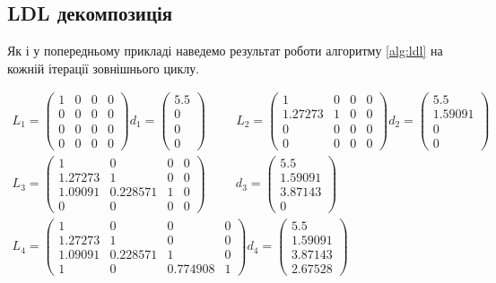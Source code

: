 \subsection*{LDL декомпозиція}

Як і у попередньому прикладі наведемо результат роботи
алгоритму \ref{alg:ldl} на кожній ітерації зовнішнього циклу.

\begin{gather*}
    L_1 = \begin{pmatrix}
        1 & 0 & 0 & 0 \\
        0 & 0 & 0 & 0 \\
        0 & 0 & 0 & 0 \\
        0 & 0 & 0 & 0
    \end{pmatrix}
    d_1 = \begin{pmatrix}
        5.5 \\ 0 \\ 0 \\ 0
    \end{pmatrix} \hspace{1cm}
    L_2 = \begin{pmatrix}
        1 & 0 & 0 & 0 \\
        1.27273 & 1 & 0 & 0 \\
        0 & 0 & 0 & 0 \\
        0 & 0 & 0 & 0
    \end{pmatrix}
    d_2 = \begin{pmatrix}
        5.5 \\ 1.59091 \\ 0 \\ 0
    \end{pmatrix} \\
    L_3 = \begin{pmatrix}
        1 & 0 & 0 & 0 \\
        1.27273 & 1 & 0 & 0 \\
        1.09091 & 0.228571 & 1 & 0 \\
        0 & 0 & 0 & 0
    \end{pmatrix} \hspace{1cm}
    d_3 = \begin{pmatrix}
        5.5 \\ 1.59091 \\ 3.87143 \\ 0
    \end{pmatrix} \\
    L_4 = \begin{pmatrix}
        1 & 0 & 0 & 0 \\
        1.27273 & 1 & 0 & 0 \\
        1.09091 & 0.228571 & 1 & 0 \\
        1 & 0 & 0.774908 & 1
    \end{pmatrix}
    d_4 = \begin{pmatrix}
        5.5 \\ 1.59091 \\ 3.87143 \\ 2.67528
    \end{pmatrix}
\end{gather*}
